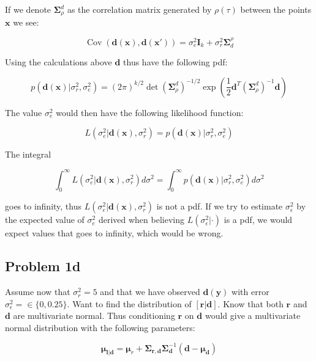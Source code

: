 \documentclass[]{article}
\newcommand{\vect}[1]{\ensuremath{\boldsymbol{\mathbf{#1}}}}
\newcommand{\matr}[1]{\ensuremath{\boldsymbol{\mathbf{#1}}}}
\DeclareMathOperator{\Cov}{\text{Cov}}
\begin{document}
If we denote \(\matr \Sigma_\rho^d\) as the correlation matrix generated
by \(\rho(\tau)\) between the points \(\vect x\) we see:

\begin{equation}
    \Cov(\vect d(\vect x), \vect d(\vect x')) = \sigma^2_e \matr I_k +\sigma^2_r\matr \Sigma^\rho_d
\end{equation}

Using the calculations above \(\vect d\) thus have the following pdf:

\begin{equation}
    p(\vect d(\vect x)|\sigma_r^2, \sigma_e^2) = (2\pi)^{k/2}\det(\matr \Sigma_\rho^d)^{-1/2}\exp(\frac{1}{2}\vect d^T(\matr\Sigma_\rho^d)^{-1}\vect d)
\end{equation}

The value \(\sigma_e^2\) would then have the following likelihood
function:

\begin{equation}
    L(\sigma_e^2 | \vect d(\vect x), \sigma_r^2)=p(\vect d(\vect x)|\sigma_r^2, \sigma_e^2)
\end{equation}

The integral

\begin{equation}
    \int_{0}^{\infty}L(\sigma_e^2 | \vect d(\vect x), \sigma_r^2)d\sigma^2 = \int_{0}^{\infty}p(\vect d(\vect x)|\sigma_r^2, \sigma_e^2) d\sigma^2
\end{equation}

goes to infinity, thus \(L(\sigma_e^2 | \vect d(\vect x), \sigma_r^2)\)
is not a pdf. If we try to estimate \(\sigma^2_\epsilon\) by the
expected value of \(\sigma_e^2\) derived when believing
\(L(\sigma^2_\epsilon|\cdot)\) is a pdf, we would expect values that
goes to infinity, which would be wrong.

\subsection{Problem 1d}\label{problem-1d}

Assume now that \(\sigma_r^2 = 5\) and that we have observed
\(\vect d(\vect y)\) with error
\(\sigma_\epsilon^2 = \in \lbrace 0, 0.25 \rbrace\). Want to find the
distribution of \(\left[ \vect r | \vect d \right]\). Know that both
\(\vect r\) and \(\vect d\) are multivariate normal. Thus conditioning
\(\vect r\) on \(\vect d\) would give a multivariate normal distribution
with the following parameters:

\begin{equation}
     \vect\mu_{\vect l | \vect d} = \vect \mu_r+ \matr \Sigma_{\vect r, \vect d} \matr \Sigma_{\vect d}^{-1}(\vect d - \vect \mu_{\vect d})
\end{equation}
\end{document}
